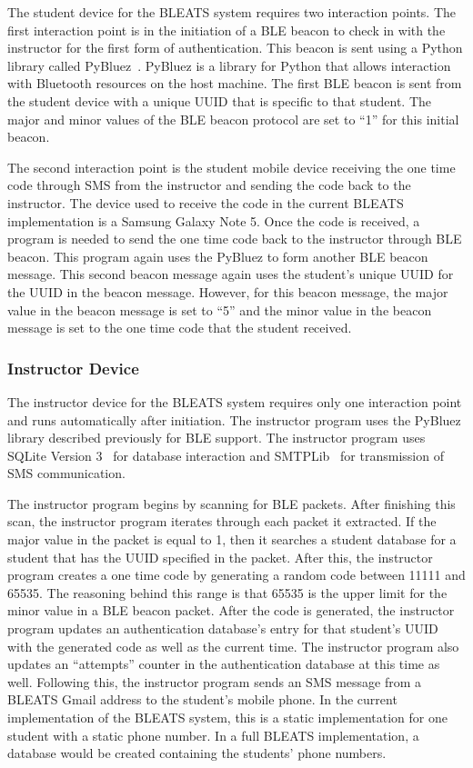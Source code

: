 The student device for the BLEATS system requires two interaction points. The
first interaction point is in the initiation of a BLE beacon to check in with
the instructor for the first form of authentication. This beacon is sent using
a Python library called PyBluez~\cite{pybluez}. PyBluez is a library for Python
that allows interaction with Bluetooth resources on the host machine. The first
BLE beacon is sent from the student device with a unique UUID that is specific
to that student. The major and minor values of the BLE beacon protocol are set
to “1” for this initial beacon.

The second interaction point is the student mobile device receiving the one
time code through SMS from the instructor and sending the code back to the
instructor. The device used to receive the code in the current BLEATS
implementation is a Samsung Galaxy Note 5. Once the code is received, a program
is needed to send the one time code back to the instructor through BLE beacon.
This program again uses the PyBluez to form another BLE beacon message. This
second beacon message again uses the student’s unique UUID for the UUID in the
beacon message. However, for this beacon message, the major value in the beacon
message is set to “5” and the minor value in the beacon message is set to the
one time code that the student received. 

\subsubsection{Instructor Device}

The instructor device for the BLEATS system requires only one interaction point
and runs automatically after initiation. The instructor program uses the
PyBluez library described previously for BLE support. The instructor program
uses SQLite Version 3~\cite{sqlite} for database interaction and
SMTPLib~\cite{smtplib} for transmission of SMS communication. 

The instructor program begins by scanning for BLE packets. After finishing this
scan, the instructor program iterates through each packet it extracted. If the
major value in the packet is equal to 1, then it searches a student database
for a student that has the UUID specified in the packet. After this, the
instructor program creates a one time code by generating a random code between
11111 and 65535. The reasoning behind this range is that 65535 is the upper
limit for the minor value in a BLE beacon packet. After the code is generated,
the instructor program updates an authentication database’s entry for that
student’s UUID with the generated code as well as the current time. The
instructor program also updates an “attempts” counter in the authentication
database at this time as well. Following this, the instructor program sends an
SMS message from a BLEATS Gmail address to the student’s mobile phone. In the
current implementation of the BLEATS system, this is a static implementation
for one student with a static phone number. In a full BLEATS implementation, a
database would be created containing the students’ phone numbers. 

